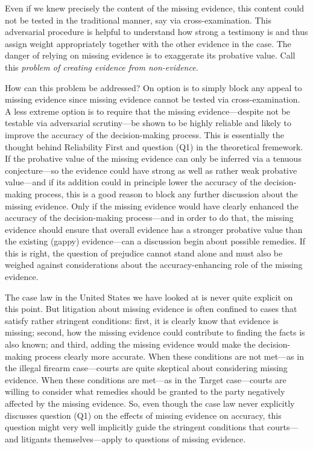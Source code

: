 \documentclass[
  10pt,
  dvipsnames,enabledeprecatedfontcommands]{scrartcl}
\begin{document}
\noindent Even if we knew precisely the content of the missing evidence,
this content could not be tested in the traditional manner, say via
cross-examination. This adversarial procedure is helpful to understand
how strong a testimony is and thus assign weight appropriately together
with the other evidence in the case. The danger of relying on missing
evidence is to exaggerate its probative value. Call this \emph{problem
of creating evidence from non-evidence}.

How can this problem be addressed? On option is to simply block any
appeal to missing evidence since missing evidence cannot be tested via
cross-examination. A less extreme option is to require that the missing
evidence---despite not be testable via adversarial scrutiny---be shown
to be highly reliable and likely to improve the accuracy of the
decision-making process. This is essentially the thought behind
Reliability First and question (Q1) in the theoretical fremework. If the
probative value of the missing evidence can only be inferred via a
tenuous conjecture---so the evidence could have strong as well as rather
weak probative value---and if its addition could in principle lower the
accuracy of the decision-making process, this is a good reason to block
any further discussion about the missing evidence. Only if the missing
evidence would have clearly enhanced the accuracy of the decision-making
process---and in order to do that, the missing evidence should ensure
that overall evidence has a stronger probative value than the existing
(gappy) evidence---can a discussion begin about possible remedies. If
this is right, the question of prejudice cannot stand alone and must
also be weighed against considerations about the accuracy-enhancing role
of the missing evidence.

The case law in the United States we have looked at is never quite
explicit on this point. But litigation about missing evidence is often
confined to cases that satisfy rather stringent conditions: first, it is
clearly know that evidence is missing; second, how the missing evidence
could contribute to finding the facts is also known; and third, adding
the missing evidence would make the decision-making process clearly more
accurate. When these conditions are not met---as in the illegal firearm
case---courts are quite skeptical about considering missing evidence.
When these conditions are met---as in the Target case---courts are
willing to consider what remedies should be granted to the party
negatively affected by the missing evidence. So, even though the case
law never explicitly discusses question (Q1) on the effects of missing
evidence on accuracy, this question might very well implicitly guide the
stringent conditions that courts---and litigants themselves---apply to
questions of missing evidence.
\end{document}
